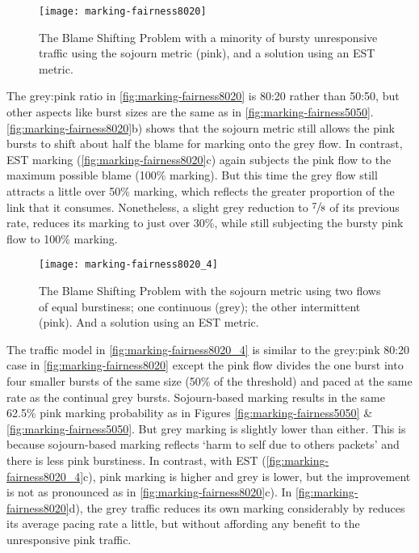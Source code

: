 \begin{figure}[h]
	\centering
	\texttt{[image: marking-fairness8020]}
	\caption{The Blame Shifting Problem with a minority of bursty unresponsive traffic using the sojourn metric (pink), and a solution using an EST metric.}\label{fig:marking-fairness8020}
\end{figure}

The grey:pink ratio in \autoref{fig:marking-fairness8020} is 80:20 rather than 50:50, but other aspects like burst sizes are the same as in \autoref{fig:marking-fairness5050}. \autoref{fig:marking-fairness8020}b) shows that the sojourn metric still allows the pink bursts to shift about half the blame for marking onto the grey flow. In contrast, EST marking (\autoref{fig:marking-fairness8020}c) again subjects the pink flow to the maximum possible blame (100\% marking). But this time the grey flow still attracts a little over 50\% marking, which reflects the greater proportion of the link that it consumes. Nonetheless, a slight grey reduction to \(\sfrac{7}{8}\) of its previous rate, reduces its marking to just over 30\%, while still subjecting the bursty pink flow to 100\% marking.

\begin{figure}[h]
	\centering
	\texttt{[image: marking-fairness8020\_4]}
	\caption{The Blame Shifting Problem with the sojourn metric using two flows of equal burstiness; one continuous (grey); the other intermittent (pink). And a solution using an EST metric.}\label{fig:marking-fairness8020_4}
\end{figure}

The traffic model in \autoref{fig:marking-fairness8020_4} is similar to the grey:pink 80:20 case in \autoref{fig:marking-fairness8020} except the pink flow divides the one burst into four smaller bursts of the same size (50\% of the threshold) and paced at the same rate as the continual grey bursts. Sojourn-based marking results in the same 62.5\% pink marking probability as in Figures \ref{fig:marking-fairness5050} \& \ref{fig:marking-fairness5050}. But grey marking is slightly lower than either. This is because sojourn-based marking reflects `harm to self due to others packets' and there is less pink burstiness. In contrast, with EST (\autoref{fig:marking-fairness8020_4}c), pink marking is higher and grey is lower, but the improvement is not as pronounced as in \autoref{fig:marking-fairness8020}c). In \autoref{fig:marking-fairness8020}d), the grey traffic reduces its own marking considerably by reduces its average pacing rate a little, but without affording any benefit to the unresponsive pink traffic. 

